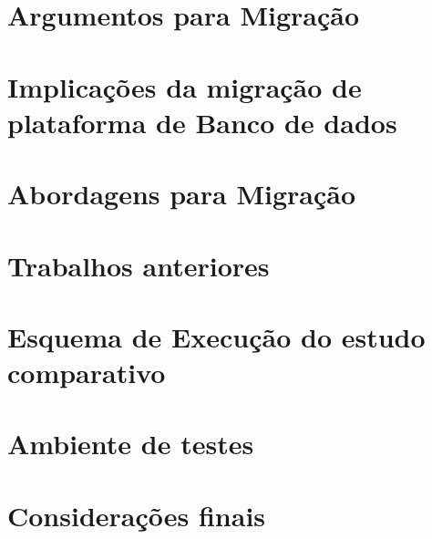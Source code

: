 \documentclass[]{article}
\begin{document}
\section{Argumentos para Migração}
\label{cha:argumentos}


\section{Implicações  da migração de plataforma de Banco de dados}
\label{cha:implicacoes}


\section{Abordagens para Migração }
\label{cha:abordagens}


\section{Trabalhos anteriores}
\label{cha:trabs}


\section{Esquema de Execução do estudo comparativo}
\label{cha:esquema}


\section{Ambiente de testes}
\label{cha:ambiente}


\section{Considerações finais}
\label{cha:consideracoes_finais}




\renewcommand{\bibname}{Referência Bibliografia}

\end{document}
